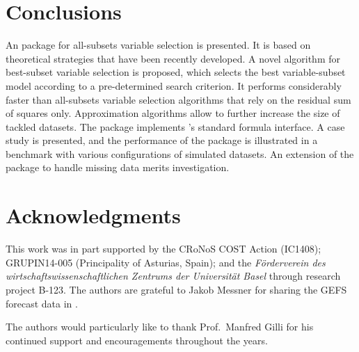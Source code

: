\documentclass[article]{jss}
\makeatletter
\let\old@code\code
\renewcommand{\code}[1]{%
  \ifmmode\text{\old@code{#1}}%
  \else\old@code{#1}\fi}
\newcommand{\R}{\proglang{R}}
\makeatother
\begin{document}
\section{Conclusions}
\label{sec:conclusions}

An {\R} package for all-subsets variable selection is presented.  It
is based on theoretical strategies that have been recently developed.
A novel algorithm for best-subset variable selection is proposed,
which selects the best variable-subset model according to a
pre-determined search criterion.  It performs considerably faster than
all-subsets variable selection algorithms that rely on the residual
sum of squares only.  Approximation algorithms allow to further
increase the size of tackled datasets.  The package implements {\R}'s
standard formula interface.  A case study is presented, and the
performance of the package is illustrated in a benchmark with various
configurations of simulated datasets.  An extension of the package to
handle missing data merits investigation.


\section*{Acknowledgments}

This work was in part supported by the CRoNoS COST Action (IC1408);
GRUPIN14-005 (Principality of Asturias, Spain); and the
\emph{F\"orderverein des wirtschaftswissenschaftlichen Zentrums der
  Universit\"at Basel} through research project B-123.  The authors
are grateful to Jakob Messner for sharing the GEFS forecast data in
.

The authors would particularly like to thank Prof.~Manfred Gilli for
his continued support and encouragements throughout the years.



\end{document}
